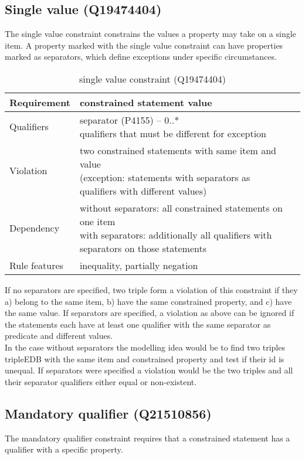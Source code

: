 \documentclass[hyperref,bachelorofscience,fleqn]{cgvpub}
\begin{document}
\subsection{Single value (Q19474404)}
The single value constraint constrains the values a property may take on a single item. A property marked with the single value constraint can have properties marked as separators, which define exceptions under specific circumstances.
\begin{table}[H]
\caption{single value constraint (Q19474404)}
\begin{tabularx}{\textwidth}{ ll X}
\hline
Requirement & constrained statement value \\
\hline
Qualifiers & \makecell{separator (P4155) -- 0..* \\ qualifiers that must be different for exception} \\
\hline
Violation & \makecell{two constrained statements with same item and value \\ (exception: statements with separators as qualifiers with different values)} \\
\hline
Dependency & \makecell{without separators: all constrained statements on one item \\ with separators: additionally all qualifiers with separators on those statements }\\
\hline
Rule features & inequality, partially negation \\
\hline
\end{tabularx}
\end{table}

If no separators are specified, two triple form a violation of this constraint if they a) belong to the same item, b) have the same constrained property, and c) have the same value.
If separators are specified, a violation as above can be ignored if the statements each have at least one qualifier with the same separator as predicate and different values.\\
In the case without separators the modelling idea would be to find two triples tripleEDB with the same item and constrained property and test if their id is unequal. If separators were specified a violation would be the two triples and all their separator qualifiers either equal or non-existent.

\subsection{Mandatory qualifier (Q21510856)}
The mandatory qualifier constraint requires that a constrained statement has a qualifier with a specific property.
\end{document}
